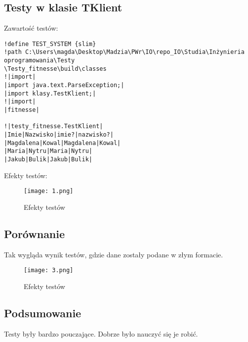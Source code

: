 \documentclass{article}
\begin{document}
\subsection{Testy w klasie TKlient}
Zawartość testów:
\begin{verbatim}
!define TEST_SYSTEM {slim}
!path C:\Users\magda\Desktop\Madzia\PWr\IO\repo_IO\Studia\Inżynieria oprogramowania\Testy
\Testy_fitnesse\build\classes
!|import|
|import java.text.ParseException;|
|import klasy.TestKlient;|
!|import|
|fitnesse|

!|testy_fitnesse.TestKlient|
|Imie|Nazwisko|imie?|nazwisko?|
|Magdalena|Kowal|Magdalena|Kowal|
|Maria|Nytru|Maria|Nytru|
|Jakub|Bulik|Jakub|Bulik|
\end{verbatim}
\newpage
Efekty testów:
	\begin{figure}[!ht]
	\centering
	\texttt{[image: 1.png]}
	\caption{Efekty testów}
	\label{fig:obrazek 2}
	\newpage
\end{figure}
\subsection{Porównanie}
Tak wygląda wynik testów, gdzie dane zostały podane w złym formacie.
	\begin{figure}[!ht]
	\centering
	\texttt{[image: 3.png]}
	\caption{Efekty testów}
	\label{fig:obrazek 3}
	\newpage
\end{figure}
\subsection{Podsumowanie}
Testy były bardzo pouczające. Dobrze było nauczyć się je robić.
\end{document}
